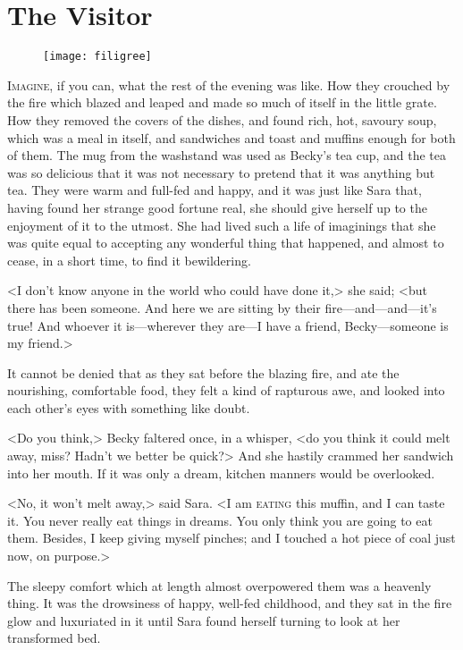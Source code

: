 \chapter{The Visitor}

\begin{figure}[t!]
\centering
\texttt{[image: filigree]}
\end{figure}

\lettrine[lines=5]{I}{magine}, if you can, what the rest of the evening was like. How they crouched by the fire which blazed and leaped and made so much of itself in the little grate. How they removed the covers of the dishes, and found rich, hot, savoury soup, which was a meal in itself, and sandwiches and toast and muffins enough for both of them. The mug from the washstand was used as Becky's tea cup, and the tea was so delicious that it was not necessary to pretend that it was anything but tea. They were warm and full-fed and happy, and it was just like Sara that, having found her strange good fortune real, she should give herself up to the enjoyment of it to the utmost. She had lived such a life of imaginings that she was quite equal to accepting any wonderful thing that happened, and almost to cease, in a short time, to find it bewildering.

<I don't know anyone in the world who could have done it,> she said; <but there has been someone. And here we are sitting by their fire—and—and—it's true! And whoever it is—wherever they are—I have a friend, Becky—someone is my friend.>

It cannot be denied that as they sat before the blazing fire, and ate the nourishing, comfortable food, they felt a kind of rapturous awe, and looked into each other's eyes with something like doubt.

<Do you think,> Becky faltered once, in a whisper, <do you think it could melt away, miss? Hadn't we better be quick?> And she hastily crammed her sandwich into her mouth. If it was only a dream, kitchen manners would be overlooked.

<No, it won't melt away,> said Sara. <I am \textsc{eating} this muffin, and I can taste it. You never really eat things in dreams. You only think you are going to eat them. Besides, I keep giving myself pinches; and I touched a hot piece of coal just now, on purpose.>

The sleepy comfort which at length almost overpowered them was a heavenly thing. It was the drowsiness of happy, well-fed childhood, and they sat in the fire glow and luxuriated in it until Sara found herself turning to look at her transformed bed.

